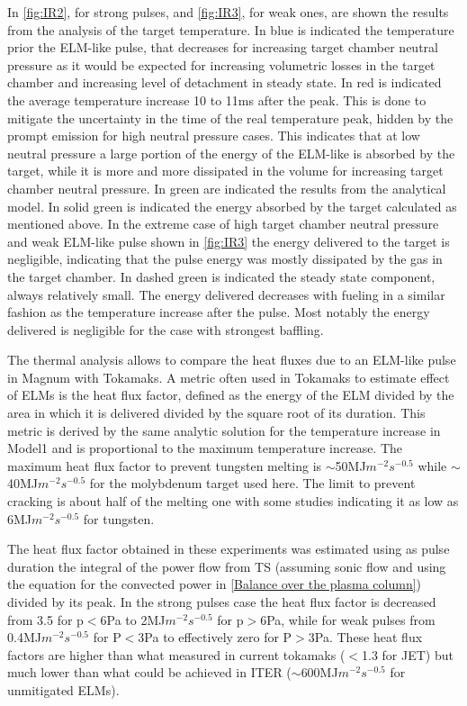 In \autoref{fig:IR2}, for strong pulses, and \autoref{fig:IR3}, for weak ones, are shown the results from the analysis of the target temperature. In blue is indicated the temperature prior the ELM-like pulse, that decreases for increasing target chamber neutral pressure as it would be expected for increasing volumetric losses in the target chamber and increasing level of detachment in steady state. In red is indicated the average temperature increase 10 to 11ms after the peak. This is done to mitigate the uncertainty in the time of the real temperature peak, hidden by the prompt emission for high neutral pressure cases. This indicates that at low neutral pressure a large portion of the energy of the ELM-like is absorbed by the target, while it is more and more dissipated in the volume for increasing target chamber neutral pressure. In green are indicated the results from the analytical model. In solid green is indicated the energy absorbed by the target calculated as mentioned above. In the extreme case of high target chamber neutral pressure and weak ELM-like pulse shown in \autoref{fig:IR3} the energy delivered to the target is negligible, indicating that the pulse energy was mostly dissipated by the gas in the target chamber. In dashed green is indicated the steady state component, always relatively small. The energy delivered decreases with fueling in a similar fashion as the temperature increase after the pulse. Most notably the energy delivered is negligible for the case with strongest baffling.

The thermal analysis allows to compare the heat fluxes due to an ELM-like pulse in Magnum with Tokamaks. A metric often used in Tokamaks to estimate effect of ELMs is the heat flux factor, defined as the energy of the ELM divided by the area in which it is delivered divided by the square root of its duration. This metric is derived by the same analytic solution for the temperature increase in Model1 and is proportional to the maximum temperature increase. The maximum heat flux factor to prevent tungsten melting is $\sim$50MJ$m^{-2} s^{-0.5}$ while $\sim$40MJ$m^{-2} s^{-0.5}$ for the molybdenum target used here. The limit to prevent cracking is about half of the melting one\cite{Pintsuk2007} with some studies indicating it as low as 6MJ$m^{-2} s^{-0.5}$ for tungsten.\cite{Linke2019}

The heat flux factor obtained in these experiments was estimated using as pulse duration the integral of the power flow from TS (assuming sonic flow and using the equation for the convected power in \autoref{Balance over the plasma column}) divided by its peak. In the strong pulses case the heat flux factor is decreased from 3.5 for p$<$6Pa to 2MJ$m^{-2} s^{-0.5}$ for p$>$6Pa, while for weak pulses from 0.4MJ$m^{-2} s^{-0.5}$ for P$<$3Pa to effectively zero for P$>$3Pa. These heat flux factors are higher than what measured in current tokamaks ($<$1.3 for JET) but much lower than what could be achieved in ITER ($\sim$600MJ$m^{-2} s^{-0.5}$ for unmitigated ELMs).\cite{Jachmich2011}

